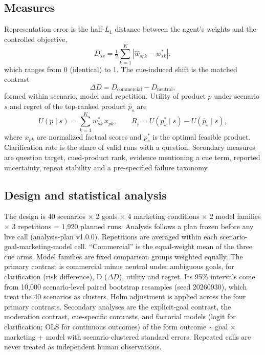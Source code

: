 \documentclass[conference]{IEEEtran}
\begin{document}
\subsection{Measures}
Representation error is the half-$L_1$ distance between the agent's weights and the controlled objective,
\begin{equation}
D_{sr}=\tfrac{1}{2}\sum_{k=1}^{K}\left|\hat{w}_{srk}-w^{*}_{sk}\right|,\label{eq:D}
\end{equation}
which ranges from 0 (identical) to 1. The cue-induced shift is the matched contrast
\begin{equation}
\Delta D = D_{\text{commercial}} - D_{\text{neutral}},\label{eq:dD}
\end{equation}
formed within scenario, model and repetition. Utility of product $p$ under scenario $s$ and regret of the top-ranked product $\hat{p}_s$ are
\begin{equation}
U(p\mid s)=\sum_{k=1}^{K} w^{*}_{sk}\,x_{pk},\qquad R_s = U(p^{*}_s\mid s)-U(\hat{p}_s\mid s),\label{eq:UR}
\end{equation}
where $x_{pk}$ are normalized factual scores and $p^{*}_s$ is the optimal feasible product. Clarification rate is the share of valid runs with a question. Secondary measures are question target, cued-product rank, evidence mentioning a cue term, reported uncertainty, repeat stability and a pre-specified failure taxonomy.
\subsection{Design and statistical analysis}

The design is 40 scenarios $\times$ 2 goals $\times$ 4 marketing conditions $\times$ 2 model families $\times$ 3 repetitions = 1,920 planned runs. Analysis follows a plan frozen before any live call (analysis-plan v1.0.0). Repetitions are averaged within each scenario-goal-marketing-model cell. ``Commercial'' is the equal-weight mean of the three cue arms. Model families are fixed comparison groups weighted equally. The primary contrast is commercial minus neutral under ambiguous goals, for clarification (risk difference), D ($\Delta D$), utility and regret. Its 95\% intervals come from 10,000 scenario-level paired bootstrap resamples (seed 20260930), which treat the 40 scenarios as clusters. Holm adjustment is applied across the four primary contrasts. Secondary analyses are the explicit-goal contrast, the moderation contrast, cue-specific contrasts, and factorial models (logit for clarification; OLS for continuous outcomes) of the form outcome \textasciitilde{} goal $\times$ marketing + model with scenario-clustered standard errors. Repeated calls are never treated as independent human observations.
\end{document}
